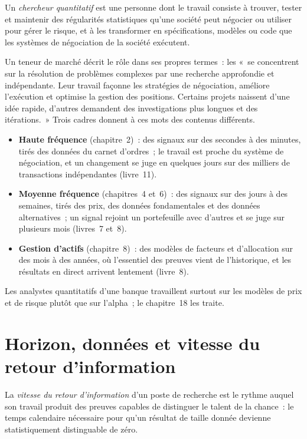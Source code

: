 \begin{definition}\label{def:in:quant-researcher:def}
Un \emph{chercheur quantitatif} est une personne dont le travail consiste à trouver, tester et maintenir
des régularités statistiques qu'une société peut négocier ou utiliser pour gérer le risque, et à les transformer en spécifications, modèles ou
code que les systèmes de négociation de la société exécutent.
\end{definition}

Un teneur de marché décrit le rôle dans ses propres termes~: les  «~se concentrent sur la résolution de problèmes complexes
par une recherche approfondie et indépendante. Leur travail façonne les stratégies de négociation, améliore l'exécution et optimise la gestion des positions.
Certains projets naissent d'une idée rapide, d'autres demandent des investigations plus longues et des itérations.~» Trois
cadres donnent à ces mots des contenus différents.
\begin{itemize}
\item \textbf{Haute fréquence} (chapitre~2)~: des signaux sur des secondes à des minutes, tirés des données du carnet d'ordres~; le travail est
proche du système de négociation, et un changement se juge en quelques jours sur des milliers de transactions indépendantes (livre~11).
\item \textbf{Moyenne fréquence} (chapitres~4 et~6)~: des signaux sur des jours à des semaines, tirés des prix, des données fondamentales et des
données alternatives~; un signal rejoint un portefeuille avec d'autres et se juge sur plusieurs mois (livres~7 et~8).
\item \textbf{Gestion d'actifs} (chapitre~8)~: des modèles de facteurs et d'allocation sur des mois à des années, où l'essentiel des
preuves vient de l'historique, et les résultats en direct arrivent lentement (livre~8).
\end{itemize}
Les analystes quantitatifs d'une banque travaillent surtout sur les modèles de prix et de risque plutôt que sur l'alpha~; le chapitre~18 les traite.

\section{Horizon, données et vitesse du retour d'information}

\begin{definition}\label{def:in:quant-researcher:feedback}
La \emph{vitesse du retour d'information} d'un poste de recherche est le rythme auquel son travail produit des preuves
capables de distinguer le talent de la chance~: le temps calendaire nécessaire pour qu'un résultat de taille donnée devienne
statistiquement distinguable de zéro.
\end{definition}

